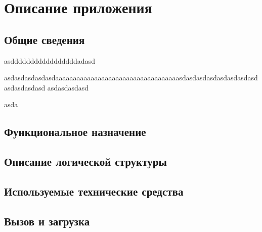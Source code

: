 \chapter{Описание приложения}
\section{Общие сведения}
asdddddddddddddddddadasd

asdasdasdasdasdaaaaaaaaaaaaaaaaaaaaaaaaaaaaaaaaaaasdasdasdasdasdasdasdasdasdasdasdasd
asdasdasdasd

asda
\section{Функциональное назначение}
\section{Описание логической структуры}
\section{Используемые технические средства}
\section{Вызов и загрузка}
